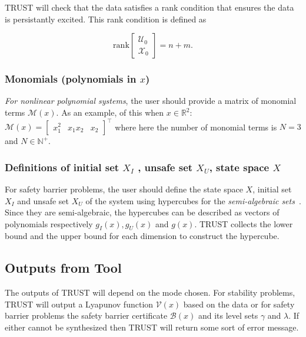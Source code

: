 \documentclass[sigconf]{acmart}
\begin{document}
\textsf{TRUST} will check that the data satisfies a rank condition that ensures the data is persistantly excited.
This rank condition is defined as~\cite{de2019formulas}

\begin{equation}
\label{eq:rank}
\text{rank}\begin{bmatrix}
\mathcal{U}_0 \\
\hline
\mathcal{X}_0
\end{bmatrix} = n+m.
\end{equation}

\subsubsection{Monomials (polynomials in $x$)}
\emph{For nonlinear polynomial systems}, the user should provide a matrix of monomial terms $\mathcal{M}(x)$.
As an example, of this when $x\in\mathbb{R}^2$: $\mathcal{M}(x) = \begin{bmatrix}
x_1^2 &
x_1 x_2 &
x_2
\end{bmatrix}^\top$
where here the number of monomial terms is $N=3$ and $N\in\mathbb{N}^+$.

\subsubsection{Definitions of initial set $X_I$ , unsafe set $X_U$, state space $X$}
For safety barrier problems, the user should define the state space $X$, initial set $X_I$ and unsafe set $X_U$ of the system using hypercubes for the \emph{semi-algebraic sets}~\cite{parrilo2003semidefinite}.
Since they are semi-algebraic, the hypercubes can be described as vectors of polynomials respectively $g_I(x), g_U(x)$ and $g(x)$. \textsf{TRUST} collects the lower bound and the upper bound for each dimension to construct the hypercube.

\subsection{Outputs from Tool}\label{subsec:outputs-from-tool}

The outputs of \textsf{TRUST} will depend on the mode chosen.
For stability problems, \textsf{TRUST} will output a Lyapunov function $\mathcal{V}(x)$ based on the data or for safety barrier problems the safety barrier certificate $\mathcal{B}(x)$ and its level sets $\gamma$ and $\lambda$.
If either cannot be synthesized then \textsf{TRUST} will return some sort of error message.
\end{document}
